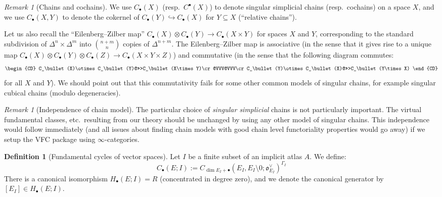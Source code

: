 \documentclass[12pt]{article}
\theoremstyle{definition}
\newtheorem{definition}[theorem]{Definition}
\theoremstyle{remark}
\newtheorem{remark}[theorem]{Remark}
\numberwithin{equation}{subsection}
\newcommand{\oo}{\mathfrak o}
\begin{document}
\begin{remark}[Chains and cochains]\label{chainfixing}
We use $C_\bullet(X)$ (resp.\ $C^\bullet(X)$) to denote singular simplicial chains (resp.\ cochains) on a space $X$, and we use $C_\bullet(X,Y)$ to denote the cokernel of $C_\bullet(Y)\hookrightarrow C_\bullet(X)$ for $Y\subseteq X$ (``relative chains'').

Let us also recall the ``Eilenberg--Zilber map'' $C_\bullet(X)\otimes C_\bullet(Y)\to C_\bullet(X\times Y)$ for spaces $X$ and $Y$, corresponding to the standard subdivision of $\Delta^n\times\Delta^m$ into $\binom{n+m}n$ copies of $\Delta^{n+m}$.  The Eilenberg--Zilber map is associative (in the sense that it gives rise to a unique map $C_\bullet(X)\otimes C_\bullet(Y)\otimes C_\bullet(Z)\to C_\bullet(X\times Y\times Z)$) and commutative (in the sense that the following diagram commutes:
\begin{equation}\label{chainproductcommutes}
\begin{CD}
C_\bullet(X)\otimes C_\bullet(Y)@>>>C_\bullet(X\times Y)\cr
@VVV@VVV\cr
C_\bullet(Y)\otimes C_\bullet(X)@>>>C_\bullet(Y\times X)
\end{CD}
\end{equation}
for all $X$ and $Y$).  We should point out that this commutativity fails for some other common models of singular chains, for example singular cubical chains (modulo degeneracies).
\end{remark}

\begin{remark}[Independence of chain model]\label{independenceofchainmodel}
The particular choice of \emph{singular simplicial} chains is not particularly important.  The virtual fundamental classes, etc.\ resulting from our theory should be unchanged by using any other model of singular chains.  This independence would follow immediately (and all issues about finding chain models with good chain level functoriality properties would go away) if we setup the VFC package using $\infty$-categories.
\end{remark}

\begin{definition}[Fundamental cycles of vector spaces]
Let $I$ be a finite subset of an implicit atlas $A$.  We define:
\begin{equation}
C_\bullet(E;I):=C_{\dim E_I+\bullet}(E_I,E_I\setminus 0;\oo_{E_I}^\vee)^{\Gamma_I}
\end{equation}
There is a canonical isomorphism $H_\bullet(E;I)=R$ (concentrated in degree zero), and we denote the canonical generator by $[E_I]\in H_\bullet(E;I)$.
\end{definition}
\end{document}
